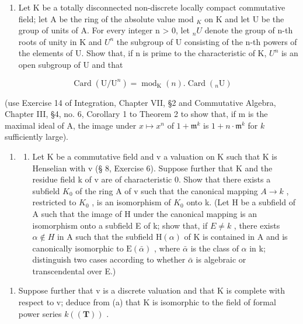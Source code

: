 \begin{enumerate}
\def\labelenumi{\arabic{enumi}.}
\setcounter{enumi}{2}
\tightlist
\item
  Let K be a totally disconnected non-discrete locally compact commutative field; let A be the ring of the absolute value mod \(_{K}\) on K and let U be the group of units of A. For every integer n \textgreater{} 0, let \(_{n}U\) denote the group of n-th roots of unity in K and \(U^{n}\) the subgroup of U consisting of the n-th powers of the elements of U. Show that, if n is prime to the characteristic of K, \(U^{n}\) is an open subgroup of U and that
\end{enumerate}

\[
\operatorname{Card} (\mathrm{U} / \mathrm{U} ^ {n}) = \operatorname{mod} _ {\mathrm{K}} (n). \operatorname{Card} (_ {n} \mathrm{U})
\]

(use Exercise 14 of Integration, Chapter VII, §2 and Commutative Algebra, Chapter III, §4, no. 6, Corollary 1 to Theorem 2 to show that, if m is the maximal ideal of A, the image under \(x \mapsto x^n\) of \(1 + \mathfrak{m}^k\) is \(1 + n \cdot \mathfrak{m}^k\) for \(k\) sufficiently large).

\begin{enumerate}
\def\labelenumi{\arabic{enumi}.}
\setcounter{enumi}{3}
\tightlist
\item
  \begin{enumerate}
  \def\labelenumii{(\alph{enumii})}
  \tightlist
  \item
    Let K be a commutative field and v a valuation on K such that K is Henselian with v (§ 8, Exercise 6). Suppose further that K and the residue field k of v are of characteristic 0. Show that there exists a subfield \(K_{0}\) of the ring A of v such that the canonical mapping \(A \rightarrow k\) , restricted to \(K_{0}\) , is an isomorphism of \(K_{0}\) onto k. (Let H be a subfield of A such that the image of H under the canonical mapping is an isomorphism onto a subfield E of k; show that, if \(E \neq k\) , there exists \(\alpha \notin H\) in A such that the subfield \(\mathrm{H}(\alpha)\) of K is contained in A and is canonically isomorphic to \(\mathrm{E}(\bar{\alpha})\) , where \(\bar{\alpha}\) is the class of \(\alpha\) in k; distinguish two cases according to whether \(\bar{\alpha}\) is algebraic or transcendental over E.)
  \end{enumerate}
\end{enumerate}

\begin{enumerate}
\def\labelenumi{(\alph{enumi})}
\setcounter{enumi}{1}
\tightlist
\item
  Suppose further that v is a discrete valuation and that K is complete with respect to v; deduce from (a) that K is isomorphic to the field of formal power series \(k((\mathbf{T}))\) .
\end{enumerate}

